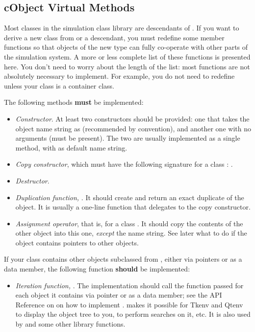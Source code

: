 \subsection{cObject Virtual Methods}

Most classes in the simulation class library are descendants of
. If you want to derive a new class from
 or a  descendant, you must redefine
some member functions so that objects of the new type can fully
co-operate with other parts of the simulation system. A more or less
complete list of these functions is presented here. You don't need to
worry about the length of the list: most functions are not
absolutely necessary to implement. For example, you do not need to
redefine  unless your class is a container class.

The following methods \textbf{must} be implemented:

\begin{itemize}
  \item{\textit{Constructor}. At least two constructors should be provided:
        one that takes the object name string as 
        (recommended by convention), and another one with no arguments
        (must be present). The two are usually implemented as a single
        method, with  as default name string.}
  \item{\textit{Copy constructor}, which must have the following signature
        for a class : .}
  \item{\textit{Destructor}.}
  \item{\textit{Duplication function,} .
        It should create and return an exact duplicate of the object.
        It is usually a one-line function that delegates to the copy constructor.}
  \item{\textit{Assignment operator}, that is, 
        for a class . It should copy the contents of the other
        object into this one, \textit{except} the name string. See later what to do
        if the object contains pointers to other objects.}
\end{itemize}

If your class contains other objects subclassed from ,
either via pointers or as a data member, the following function \textbf{should}
be implemented:

\begin{itemize}
  \item{\textit{Iteration function,} .
        The implementation should call the function passed
        for each object it contains via pointer or as a data member;
        see the API Reference on  on how to implement
        .  makes it possible
        for Tkenv and Qtenv to display the object tree to you, to perform searches on it, etc.
        It is also used by  and some other library functions.}
\end{itemize}

